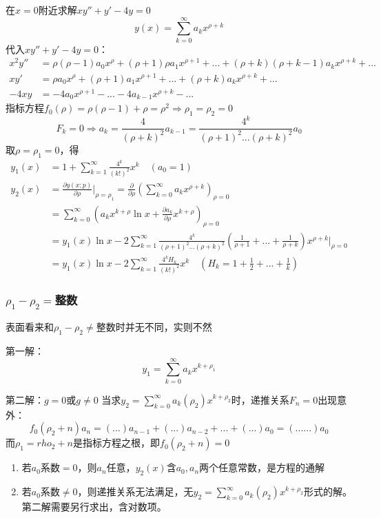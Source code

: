 \begin{ex}
    在$x=0$附近求解$xy''+y'-4y=0$
    $$y(x)=\sum_{k=0}^\infty a_kx^{\rho+k}$$
    代入$xy''+y'-4y=0$：
    $$\begin{aligned}
    x^2y''&=\rho(\rho-1)a_0x^\rho+(\rho+1)\rho a_1x^{\rho+1}+...+(\rho+k)(\rho+k-1)a_kx^{\rho+k}+...\\
    xy'&=\rho a_0x^\rho+(\rho+1)a_1x^{\rho+1}+...+(\rho+k)a_kx^{\rho+k}+...\\
    -4xy&=-4a_0x^{\rho+1}-...-4a_{k-1}x^{\rho+k}-...
    \end{aligned}$$
    指标方程$f_0(\rho)=\rho(\rho-1)+\rho=\rho^2\Rightarrow\rho_1=\rho_2=0$
    $$F_k=0\Rightarrow a_k=\frac{4}{(\rho+k)^2}a_{k-1}=\frac{4^k}{(\rho+1)^2...(\rho+k)^2}a_0$$
    取$\rho=\rho_1=0$，得
    $$\begin{aligned}
        y_1(x)&=1+\sum_{k=1}^\infty\frac{4^k}{(k!)^2}x^k\quad(a_0=1)\\
        y_2(x)&=\frac{\partial y(x;p)}{\partial\rho}\bigg|_{\rho=\rho_1}=\frac{\partial}{\partial\rho}\left(\sum_{k=0}^\infty a_kx^{\rho+k}\right)_{\rho=0}\\
    &=\sum_{k=0}^\infty\left(a_kx^{k+\rho}\ln x+\frac{\partial a_k}{\partial\rho}x^{k+\rho}\right)_{\rho=0}\\
    &=y_1(x)\ln x-2\sum_{k=1}^\infty\frac{4^k}{(\rho+1)^2...(\rho+k)^2}\left(\frac{1}{\rho+1}+...+\frac{1}{\rho+k}\right)x^{\rho+k}\bigg|_{\rho=0}\\&=y_1(x)\ln x-2\sum_{k=1}^\infty\frac{4^kH_k}{(k!)^2}x^k\quad \left(H_k=1+\frac{1}{2}+...+\frac{1}{k}\right)
    \end{aligned}$$
\end{ex}
\subsubsection{$\rho_1-\rho_2=$整数}
表面看来和$\rho_1-\rho_2\ne$整数时并无不同，实则不然

第一解：$$y_1=\sum_{k=0}^\infty a_kx^{k+\rho_1}$$

第二解：$g=0$或$g\ne0$
当求$y_2=\sum_{k=0}^\infty a_k(\rho_2)x^{k+\rho_2}$时，递推关系$F_n=0$出现意外：
$$
f_0(\rho_2+n)a_n=(...)a_{n-1}+(...)a_{n-2}+...+(...)a_0=(......)a_0
$$
而$\rho_1=rho_2+n$是指标方程之根，即$f_0(\rho_2+n)=0$

\begin{enumerate}
    \item 若$a_0$系数$=0$，则$a_n$任意，$y_2(x)$含$a_0,a_n$两个任意常数，是方程的通解
    \item 若$a_0$系数$\ne0$，则递推关系无法满足，无$y_2=\sum_{k=0}^\infty a_k(\rho_2)x^{k+\rho_2}$形式的解。第二解需要另行求出，含对数项。
\end{enumerate}

